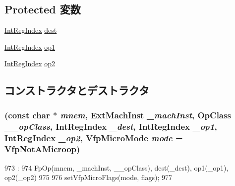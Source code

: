 \subsection*{Protected 変数}
\begin{DoxyCompactItemize}
\item 
\hyperlink{namespaceArmISA_ae64680ba9fb526106829d6bf92fc791b}{IntRegIndex} \hyperlink{classArmISA_1_1FpRegRegRegOp_aec72e8e45bdc87abeeeb75d2a8a9a716}{dest}
\item 
\hyperlink{namespaceArmISA_ae64680ba9fb526106829d6bf92fc791b}{IntRegIndex} \hyperlink{classArmISA_1_1FpRegRegRegOp_a4c465c43ad568f8bcf8ae71480e9cfea}{op1}
\item 
\hyperlink{namespaceArmISA_ae64680ba9fb526106829d6bf92fc791b}{IntRegIndex} \hyperlink{classArmISA_1_1FpRegRegRegOp_a7799ff6cbe5a252199059eb8665820e7}{op2}
\end{DoxyCompactItemize}


\subsection{コンストラクタとデストラクタ}
\hypertarget{classArmISA_1_1FpRegRegRegOp_aaa9088e2711d2effd34d465b53be6135}{
\subsubsection[{FpRegRegRegOp}]{ (const char $\ast$ {\em mnem}, \/  {\bf ExtMachInst} {\em \_\-machInst}, \/  OpClass {\em \_\-\_\-opClass}, \/  {\bf IntRegIndex} {\em \_\-dest}, \/  {\bf IntRegIndex} {\em \_\-op1}, \/  {\bf IntRegIndex} {\em \_\-op2}, \/  {\bf VfpMicroMode} {\em mode} = {\ttfamily VfpNotAMicroop})}}
\label{classArmISA_1_1FpRegRegRegOp_aaa9088e2711d2effd34d465b53be6135}



\begin{DoxyCode}
973                                                       :
974         FpOp(mnem, _machInst, __opClass), dest(_dest), op1(_op1), op2(_op2)
975     {
976         setVfpMicroFlags(mode, flags);
977     }

\end{DoxyCode}


